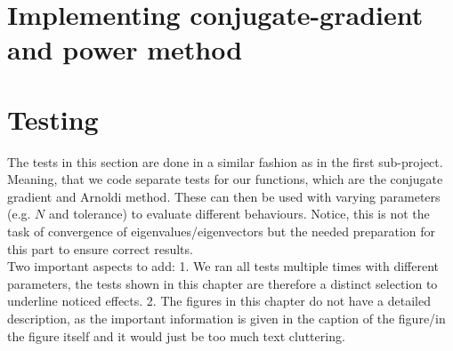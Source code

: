 \documentclass[11pt, letterpaper, onecolumn]{article}
\begin{document}
	
	
	\section{Implementing conjugate-gradient and power method}
	


	
	
	\section{Testing}
	The tests in this section are done in a similar fashion as in the first sub-project. Meaning, that we code separate tests for our functions, which are the conjugate gradient and Arnoldi method. These can then be used with varying parameters (e.g. $N$ and tolerance) to evaluate different behaviours. Notice, this is not the task of convergence of eigenvalues/eigenvectors but the needed preparation for this part to ensure correct results. \\
	Two important aspects to add: 1. We ran all tests multiple times with different parameters, the tests shown in this chapter are therefore a distinct selection to underline noticed effects. 2. The figures in this chapter do not have a detailed description, as the important information is given in the caption of the figure/in the figure itself and it would just be too much text cluttering.
\end{document}
